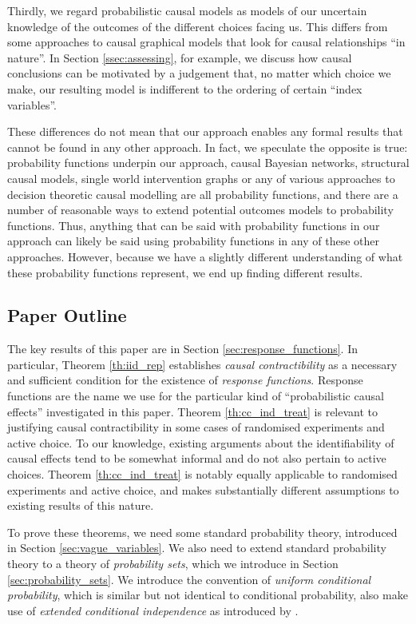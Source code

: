 \documentclass{article}
\theoremstyle{plain}
\theoremstyle{definition}
\begin{document}
Thirdly, we regard probabilistic causal models as models of our uncertain knowledge of the outcomes of the different choices facing us. This differs from some approaches to causal graphical models that look for causal relationships ``in nature''. In Section \ref{ssec:assessing}, for example, we discuss how causal conclusions can be motivated by a judgement that, no matter which choice we make, our resulting model is indifferent to the ordering of certain ``index variables''.

These differences do not mean that our approach enables any formal results that cannot be found in any other approach. In fact, we speculate the opposite is true: probability functions underpin our approach, causal Bayesian networks, structural causal models, single world intervention graphs or any of various approaches to decision theoretic causal modelling are all probability functions, and there are a number of reasonable ways to extend potential outcomes models to probability functions. Thus, anything that can be said with probability functions in our approach can likely be said using probability functions in any of these other approaches. However, because we have a slightly different understanding of what these probability functions represent, we end up finding different results.


\subsection{Paper Outline}

The key results of this paper are in Section \ref{sec:response_functions}. In particular, Theorem \ref{th:iid_rep} establishes \emph{causal contractibility} as a necessary and sufficient condition for the existence of \emph{response functions}. Response functions are the name we use for the particular kind of ``probabilistic causal effects'' investigated in this paper. Theorem \ref{th:cc_ind_treat} is relevant to justifying causal contractibility in some cases of randomised experiments and active choice. To our knowledge, existing arguments about the identifiability of causal effects tend to be somewhat informal and do not also pertain to active choices. Theorem \ref{th:cc_ind_treat} is notably equally applicable to randomised experiments and active choice, and makes substantially different assumptions to existing results of this nature.

To prove these theorems, we need some standard probability theory, introduced in Section \ref{sec:vague_variables}. We also need to extend standard probability theory to a theory of \emph{probability sets}, which we introduce in Section \ref{sec:probability_sets}. We introduce the convention of \emph{uniform conditional probability}, which is similar but not identical to conditional probability, also make use of \emph{extended conditional independence} as introduced by \citet{constantinou_extended_2017}.
\end{document}
